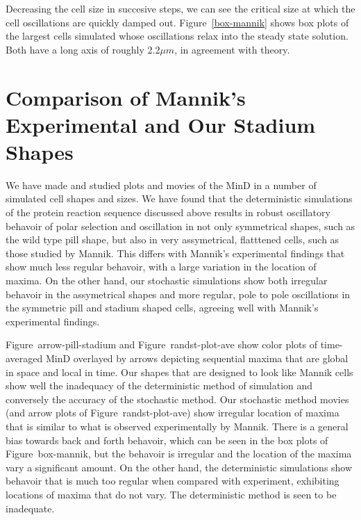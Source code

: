 \documentclass[letterpaper,twocolumn,amsmath,amssymb,pre]{revtex4-1}
\begin{document}
Decreasing the cell size in succesive steps, we can see the critical
size at which the cell oscillations are quickly damped out.
Figure~\ref{box-mannik} shows box plots of the largest cells simulated
whose oscillations relax into the steady state solution.  Both have a
long axis of roughly 2.2$\mu m$, in agreement with theory.

\section{Comparison of Mannik's Experimental and Our Stadium Shapes}
We have made and studied plots and movies of the MinD in a number of
simulated cell shapes and sizes. We have found that the deterministic
simulations of the protein reaction sequence discussed above results
in robust oscillatory behavoir of polar selection and oscillation in
not only symmetrical shapes, such as the wild type pill shape, but
also in very assymetrical, flatttened cells, such as those studied by
Mannik.  This differs with Mannik's experimental findings that show
much less regular behavoir, with a large variation in the location of
maxima.  On the other hand, our stochastic simulations show both
irregular behavoir in the assymetrical shapes and more regular, pole
to pole oscillations in the symmetric pill and stadium shaped cells,
agreeing well with Mannik's experimental findings.

Figure~{arrow-pill-stadium} and Figure~{randst-plot-ave} show color
plots of time-averaged MinD overlayed by arrows depicting sequential
maxima that are global in space and local in time.  Our shapes that
are designed to look like Mannik cells show well the inadequacy of the
deterministic method of simulation and conversely the accuracy of the
stochastic method.  Our stochastic method movies (and arrow plots of
Figure~{randst-plot-ave}) show irregular location of maxima that is
similar to what is observed experimentally by Mannik. There is a
general bias towards back and forth behavoir, which can be seen in the
box plots of Figure~{box-mannik}, but the behavoir is irregular and
the location of the maxima vary a significant amount.  On the other
hand, the deterministic simulations show behavoir that is much too
regular when compared with experiment, exhibiting locations of maxima
that do not vary.  The deterministic method is seen to be inadequate.
\end{document}
